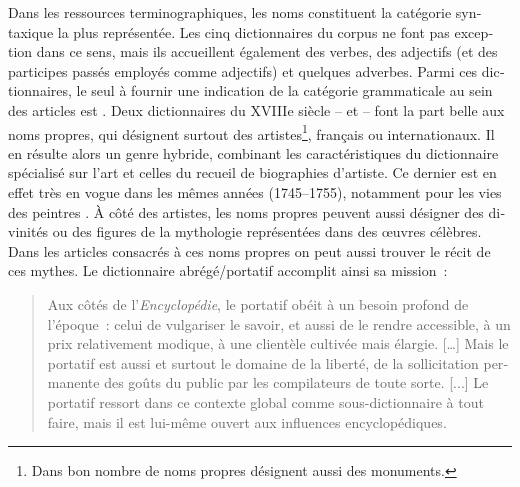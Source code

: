 \documentclass[output=paper,colorlinks,citecolor=brown,arabicfont,chinesefont,booklanguage=french]{langscibook}
\begin{document}
\begin{otherlanguage}{french}
Dans les ressources terminographiques, les noms constituent la catégorie syntaxique la plus représentée. Les cinq dictionnaires du corpus ne font pas exception dans ce sens, mais ils accueillent également des verbes, des adjectifs (et des participes passés employés comme adjectifs) et quelques adverbes. Parmi ces dictionnaires, le seul à fournir une indication de la catégorie grammaticale au sein des articles est \citet{Boutard1826}. Deux dictionnaires du XVIIIe siècle – \citet{Marsy1746} et \citet{Lacombe1752} – font la part belle aux noms propres, qui désignent surtout des artistes\footnote{Dans \citet{Marsy1746} bon nombre de noms propres désignent aussi des monuments.}, français ou internationaux. Il en résulte alors un genre hybride, combinant les caractéristiques du dictionnaire spécialisé sur l’art et celles du recueil de biographies d’artiste. Ce dernier est en effet très en vogue dans les mêmes années (1745--1755), notamment pour les vies des peintres \citep[171]{Maes2016}. À côté des artistes, les noms propres peuvent aussi désigner des divinités ou des figures de la mythologie représentées dans des œuvres célèbres. Dans les articles consacrés à ces noms propres on peut aussi trouver le récit de ces mythes. Le dictionnaire abrégé\slash portatif accomplit ainsi sa mission~:

\begin{quote}
    Aux côtés de l’\emph{Encyclopédie}, le portatif obéit à un besoin profond de l’époque~: celui de vulgariser le savoir, et aussi de le rendre accessible, à un prix relativement modique, à une clientèle cultivée mais élargie. […] Mais le portatif est aussi et surtout le domaine de la liberté, de la sollicitation permanente des goûts du public par les compilateurs de toute sorte. [...] Le portatif ressort dans ce contexte global comme sous-dictionnaire à tout faire, mais il est lui-même ouvert aux influences encyclopédiques. \citep[191]{MartinChartier1984}
\end{quote}


\end{otherlanguage}
\end{document}
